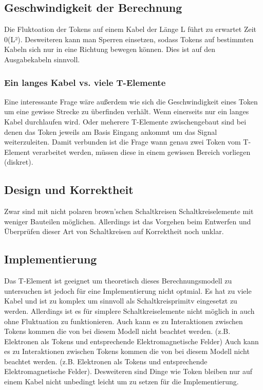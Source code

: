 \documentclass[11pt,a4paper]{article}
\begin{document}
\subsection{Geschwindigkeit der Berechnung}
Die Fluktoation der Tokens auf einem Kabel der Länge L führt zu 
erwartet Zeit 0(L²).
%
Desweiteren kann man Sperren einsetzen, sodass Tokens
auf bestimmten Kabeln sich nur in eine Richtung bewegen können. 
%
Dies ist auf den Ausgabekabeln sinnvoll.


\subsubsection{Ein langes Kabel vs. viele T-Elemente}
Eine interessante Frage wäre außerdem wie sich die Geschwindigkeit eines 
Token um eine gewisse Strecke zu überfinden verhält. 
%
Wenn einerseits nur ein langes Kabel durchlaufen wird. 
%
Oder meherere T-Elemente zwischengebaut sind bei denen das Token jeweils
am Basis Eingang ankommt um das Signal weiterzuleiten.
% 
Damit verbunden ist die Frage wann genau zwei Token vom T-Element 
verarbeitet werden, müssen diese in einem gewissen Bereich vorliegen (diskret).

\subsection{Design und Korrektheit}
Zwar sind mit nicht polaren brown'schen Schaltkreisen Schaltkreiselemente mit
weniger Bauteilen möglichen.
%
Allerdings ist das Vorgehen beim Entwerfen und Überprüfen dieser Art von 
Schaltkreisen auf Korrektheit noch unklar. 


\subsection{Implementierung}
Das T-Element ist geeignet um theoretisch dieses Berechnungsmodell zu 
untersuchen ist jedoch für eine Implementierung nicht optmial.
%
Es hat zu viele Kabel und ist zu komplex um sinnvoll als Schaltkreisprimitv
eingesetzt zu werden. 
%
Allerdings ist es für simplere Schaltkreiselemente nicht möglich in auch ohne 
Fluktuation zu funktionieren.
%
Auch kann es zu Interaktionen zwischen Tokens kommen die von bei diesem Modell
nicht beachtet werden. (z.B. Elektronen als Tokens und entsprechende 
Elektromagnetische Felder)
%
Auch kann es zu Interaktionen zwischen Tokens kommen die von bei diesem Modell
nicht beachtet werden. (z.B. Elektronen als Tokens und entsprechende 
Elektromagnetische Felder). Desweiteren sind Dinge wie Token bleiben nur
auf einem Kabel nicht unbedingt leicht um zu setzen für die Implementierung.





\end{document}

